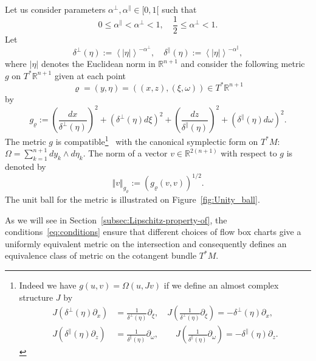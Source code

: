 \documentclass[10pt]{amsart}
\theoremstyle{definition}\newtheorem{defi}[theo]{Definition}\newtheorem{rema}[theo]{Remark}\newtheorem{exam}[theo]{Example}\newtheorem{exem}[theo]{Example}\newtheorem{nota}[theo]{Notation}
\newcommand{\bbR}{\mathbb{R}}
\begin{document}
Let us consider parameters $\alpha^{\perp},\alpha^{\parallel}\in[0,1[$ such that
\begin{equation}\label{eq:conditions}
0\leq\alpha^{\parallel}<\alpha^{\perp}<1,\quad\frac{1}{2}\leq\alpha^{\perp}<1.
\end{equation}
Let
\begin{equation}\label{eq:def_delta}
\delta^{\perp}\left(\eta\right):=\left\langle \left|\eta\right|\right\rangle ^{-\alpha^{\perp}},\quad\delta^{\parallel}\left(\eta\right):=\left\langle \left|\eta\right|\right\rangle ^{-\alpha^{\parallel}},
\end{equation}
where $|\eta|$ denotes the Euclidean norm in $\bbR^{n+1}$ and consider the following metric $g$ on $T^{*}\bbR^{n+1}$ given at each point
\[
\varrho=\left(y,\eta\right)=\left(\left(x,z\right),\left(\xi,\omega\right)\right)\in T^{*}\bbR^{n+1}
\]
by
\begin{equation}\label{eq:metric_g_in_coordinates}
g_{\varrho}:=\left(\frac{dx}{\delta^{\perp}\left(\eta\right)}\right)^{2}+\left(\delta^{\perp}\left(\eta\right)d\xi\right)^{2}+\left(\frac{dz}{\delta^{\parallel}\left(\eta\right)}\right)^{2}+\left(\delta^{\parallel}\left(\eta\right)d\omega\right)^{2}.
\end{equation}
The metric $g$ is compatible\footnote{Indeed we have $g(u,v)=\Omega(u,Jv)$ if we define an almost complex structure $J$ by
\begin{align*}
J\left(\delta^{\perp}\left(\eta\right)\partial_{x}\right) & =\frac{1}{\delta^{\perp}\left(\eta\right)}\partial_{\xi},\quad J\left(\frac{1}{\delta^{\perp}\left(\eta\right)}\partial_{\xi}\right)=-\delta^{\perp}\left(\eta\right)\partial_{x},\\
J\left(\delta^{\parallel}\left(\eta\right)\partial_{z}\right) & =\frac{1}{\delta^{\parallel}\left(\eta\right)}\partial_{\omega},\qquad J\left(\frac{1}{\delta^{\parallel}\left(\eta\right)}\partial_{\omega}\right)=-\delta^{\parallel}\left(\eta\right)\partial_{z}.
\end{align*}
}~\cite{da_silva_01,mac_duff_98} with the canonical symplectic form on $T^{*}M$: $\Omega=\sum_{k=1}^{n+1}dy_{k}\wedge d\eta_{k}$. The norm of a vector $v\in\bbR^{2(n+1)}$ with respect to $g$ is denoted by
\begin{equation}\label{eq:def_norm_g}
\left\Vert v\right\Vert _{g_{\varrho}}:=\left(g_{\varrho}\left(v,v\right)\right)^{1/2}.
\end{equation}
The unit ball for the metric is illustrated on Figure~\ref{fig:Unity_ball}.

As we will see in Section~\ref{subsec:Lipschitz-property-of}, the conditions~\eqref{eq:conditions} ensure that different choices of flow box charts give a uniformly equivalent metric on the intersection and consequently defines an equivalence class of metric on the cotangent bundle $T^{*}M$.
\end{document}
